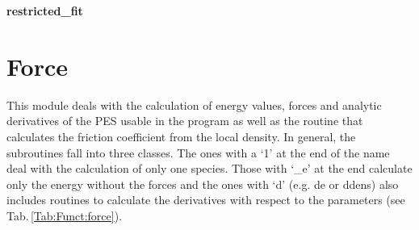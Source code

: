 \documentclass[twoside, 11pt, titlepage, captions=nooneline, a4paper, headsepline]{scrbook}%
\newcommand{\9}{\mathrm}
\newcommand{\0}{\,\mathrm}
\begin{document}
\textbf{restricted\_fit}\\

\section{Force}
This module deals with the calculation of energy values, forces and analytic derivatives of the PES usable in the program as well as the routine that calculates the friction coefficient from the local density. In general, the subroutines fall into three classes. The ones with a `1' at the end of the name deal with the calculation of only one species. Those with `\_e' at the end calculate only the energy without the forces and the ones with `d' (e.g. de or ddens) also includes routines to calculate the derivatives with respect to the parameters (see Tab.\,\ref{Tab:Funct:force}).
\end{document}
